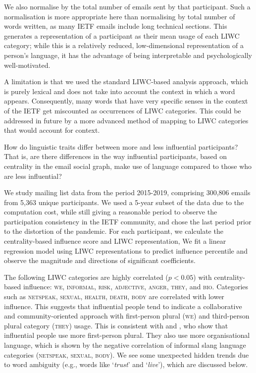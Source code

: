 \documentclass[twocolumn,10pt]{article}
\newcommand{\pb}[1]{\vspace{0.75ex}\noindent{\textbf{#1}}}
\newcommand{\liwc}[1]{\textsc{#1}}
\begin{document}
We also normalise by the total number of emails sent by that participant. 
Such a normalisation is more appropriate here than normalising by total
number of words written, as many IETF emails include long technical
sections.  This generates a representation of a participant as their mean
usage of each LIWC category; while this is a relatively reduced,
low-dimensional representation of a person's language, it has the advantage
of being interpretable and psychologically well-motivated. 

A limitation is that we used the standard LIWC-based analysis approach,
which is purely lexical and does not take into account the context in which
a word appears. Consequently, many words that have very specific senses in
the context of the IETF get miscounted as occurrences of LIWC categories.
This could be addressed in future by a more advanced method of mapping to
LIWC categories that would account for context. 


\pb{Language and Influence:} How do linguistic traits differ between more
and less influential participants? That is, are there differences in the
way influential participants, based on centrality in the email social
graph, make use of language compared to those who are less influential?

We study mailing list data from the period 2015-2019, comprising 300,806
emails from 5,363 unique participants. We used a 5-year subset of the data
due to the computation cost, while still giving a reasonable period to
observe the participation consistency in the IETF community, and chose the
last period prior to the distortion of the pandemic.  For each participant,
we calculate the centrality-based influence score and LIWC representation,
We fit a linear regression model using LIWC representations to predict
influence percentile and observe the magnitude and directions of
significant coefficients.

The following LIWC categories are highly correlated ($p < 0.05$) with
centrality-based influence: \liwc{we, informal, risk, adjective, anger,
they}, and \liwc{bio}.  Categories such as \liwc{netspeak, sexual, health,
death, body} are correlated with lower influence. This suggests that
influential people tend to indicate a collaborative and community-oriented
approach with first-person plural (\liwc{we}) and third-person plural
category (\liwc{they}) usage. This is consistent with
\cite{kacewicz2014pronoun} and \cite{guinote2017power}, who show that
influential people use more first-person plural. They also use more
organisational language, which is shown by the negative correlation of
informal slang language categories (\liwc{netspeak, sexual, body}). We see
some unexpected hidden trends due to word ambiguity (e.g., words like
`\textit{trust}' and `\textit{live}'), which are discussed below.
\end{document}
